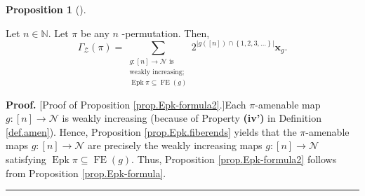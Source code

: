 \documentclass[numbers=enddot,12pt,final,onecolumn,notitlepage]{scrartcl}%
\theoremstyle{definition}
\newtheorem{prop}[theo]{Proposition}
\newenvironment{proposition}[1][]
{\begin{prop}[#1]\begin{leftbar}}
{\end{leftbar}\end{prop}}
\newenvironment{proof}[1][Proof]{\noindent\textbf{#1.} }{\ \rule{0.5em}{0.5em}}
\newenvironment{vershort}{}{}
\let\sumnonlimits\sum
\renewcommand{\sum}{\sumnonlimits\limits}
\begin{document}
\begin{proposition}
\label{prop.Epk-formula2}Let $n\in\mathbb{N}$. Let $\pi$ be any $n$%
-permutation. Then,%
\[
\Gamma_{\mathcal{Z}}\left(  \pi\right)  =\sum_{\substack{g:\left[  n\right]
\rightarrow\mathcal{N}\text{ is}\\\text{weakly increasing;}%
\\\operatorname{Epk}\pi\subseteq\operatorname*{FE}\left(  g\right)
}}2^{\left\vert g\left(  \left[  n\right]  \right)  \cap\left\{
1,2,3,\ldots\right\}  \right\vert }\mathbf{x}_{g}.
\]

\end{proposition}

\begin{vershort}
\begin{proof}
[Proof of Proposition \ref{prop.Epk-formula2}.]Each $\pi$-amenable map
$g:\left[  n\right]  \rightarrow\mathcal{N}$ is weakly increasing (because of
Property \textbf{(iv')} in Definition \ref{def.amen}). Hence, Proposition
\ref{prop.Epk.fiberends} yields that the $\pi$-amenable maps $g:\left[
n\right]  \rightarrow\mathcal{N}$ are precisely the weakly increasing maps
$g:\left[  n\right]  \rightarrow\mathcal{N}$ satisfying
$\operatorname{Epk} \pi\subseteq\operatorname*{FE}\left(  g\right)  $.
Thus, Proposition \ref{prop.Epk-formula2} follows from
Proposition \ref{prop.Epk-formula}.
\end{proof}
\end{vershort}
\end{document}

